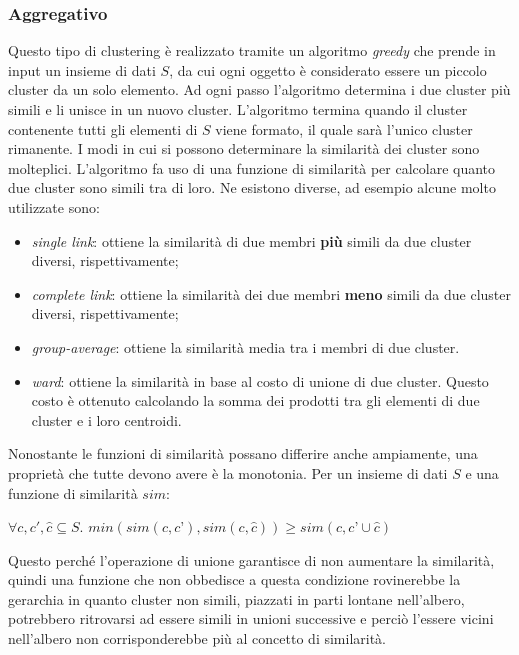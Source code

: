 \documentclass{llncs}
\begin{document}
	\subsubsection{Aggregativo}
	Questo tipo di clustering è realizzato tramite un algoritmo \textit{greedy} che prende in input un insieme di dati $S$, da cui ogni oggetto è considerato essere un piccolo cluster da un solo elemento.
	Ad ogni passo l'algoritmo determina i due cluster più simili e li unisce in un nuovo cluster. L'algoritmo termina
	quando il cluster contenente tutti gli elementi di $S$ viene formato, il quale sarà l'unico cluster rimanente.
	I modi in cui si possono determinare la similarità dei cluster sono molteplici. L'algoritmo fa uso di una funzione di similarità per calcolare quanto due cluster sono simili tra di loro.
	Ne esistono diverse, ad esempio alcune molto utilizzate sono:
	\begin{itemize}
		\item \textit{single link}: ottiene la similarità di due membri \textbf{più} simili da due cluster diversi, rispettivamente;
		\item \textit{complete link}: ottiene la similarità dei due membri \textbf{meno} simili da due cluster diversi, rispettivamente;
		\item \textit{group-average}: ottiene la similarità media tra i membri di due cluster.
		\item \textit{ward}: ottiene la similarità in base al costo di unione di due cluster. Questo costo è ottenuto calcolando la somma dei prodotti tra gli elementi di due cluster e i loro centroidi. 
	\end{itemize}
	Nonostante le funzioni di similarità possano differire anche ampiamente, una proprietà che tutte devono avere è la monotonia. Per un insieme di dati $S$ e una funzione di similarità $sim$:
	\begin{center}
		$\forall c, c', \hat{c} \subseteq S$. $min(sim(c, c’), sim(c, \hat{c})) \ge sim(c, c’ \cup \hat{c})$
	\end{center}
	Questo perché l'operazione di unione garantisce	di non aumentare la similarità, quindi una funzione che non obbedisce a questa condizione
	rovinerebbe la gerarchia in quanto cluster non simili, piazzati in parti lontane nell'albero, potrebbero
	ritrovarsi ad essere simili in unioni successive e perciò l'essere vicini nell'albero non corrisponderebbe più al concetto di similarità.
\end{document}
